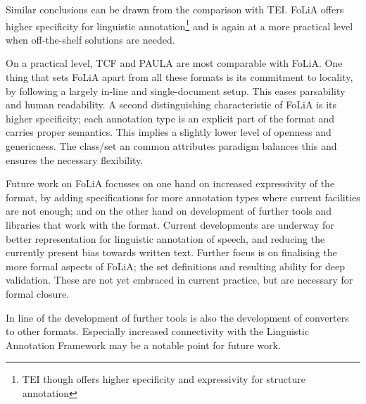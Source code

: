 \documentclass[a4paper,10pt,twoside]{article}
\begin{document}
Similar conclusions can be drawn from the comparison with TEI. FoLiA offers
higher specificity for linguistic annotation\footnote{TEI though offers higher
specificity and expressivity for structure annotation} and is again at a more
practical level when off-the-shelf solutions are needed.

On a practical level, TCF and PAULA are most comparable with FoLiA. One thing
that sets FoLiA apart from all these formats is its commitment to locality, by
following a largely in-line and single-document setup. This eases
parsability and human readability. A second distinguishing characteristic of
FoLiA is its higher specificity; each annotation type is an explicit part of
the format and carries proper semantics. This implies a slightly lower level of
openness and genericness. The class/set an common attributes paradigm balances
this and ensures the necessary flexibility.

Future work on FoLiA focusses on one hand on increased expressivity of the
format, by adding specifications for more annotation types where current
facilities are not enough; and on the other hand on development of further
tools and libraries that work with the format. Current developments are
underway for better representation for linguistic annotation of speech, and
reducing the currently present bias towards written text. Further focus is on
finalising the more formal aspects of FoLiA; the set definitions and resulting
ability for deep validation. These are not yet embraced in current practice,
but are necessary for formal closure.

In line of the development of further tools is also the development of
converters to other formats. Especially increased connectivity with the
Linguistic Annotation Framework may be a notable point for future work.

 
  
\end{document}

